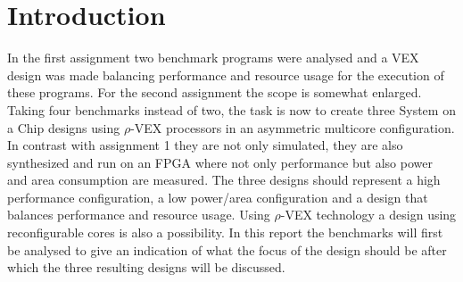 \section{Introduction}
\label{sec:introduction}
In the first assignment two benchmark programs were analysed and a VEX design was made balancing performance and resource usage for the execution of these programs.
For the second assignment the scope is somewhat enlarged.
Taking four benchmarks instead of two, the task is now to create three System on a Chip designs using $\rho$-VEX processors in an asymmetric multicore configuration.
In contrast with assignment 1 they are not only simulated, they are also synthesized and run on an FPGA where not only performance but also power and area consumption are measured.
The three designs should represent a high performance configuration, a low power/area configuration and a design that balances performance and resource usage.
Using $\rho$-VEX technology a design using reconfigurable cores is also a possibility.
In this report the benchmarks will first be analysed to give an indication of what the focus of the design should be after which the three resulting designs will be discussed.